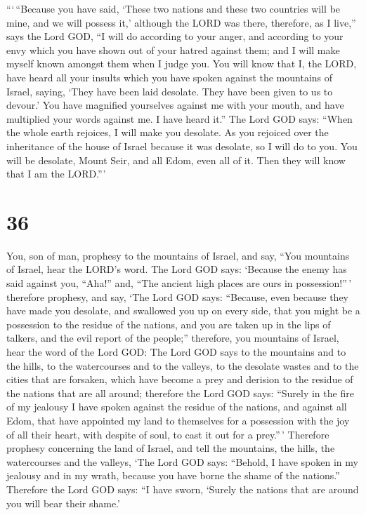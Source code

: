  ```\,``Because you have said, `These two nations and these
two countries will be mine, and we will possess it,' although the LORD
was there,  therefore, as I live,'' says the Lord GOD, ``I
will do according to your anger, and according to your envy which you
have shown out of your hatred against them; and I will make myself known
amongst them when I judge you.  You will know that I, the
LORD, have heard all your insults which you have spoken against the
mountains of Israel, saying, `They have been laid desolate. They have
been given to us to devour.'  You have magnified yourselves
against me with your mouth, and have multiplied your words against me. I
have heard it.''  The Lord GOD says: ``When the whole earth
rejoices, I will make you desolate.  As you rejoiced over
the inheritance of the house of Israel because it was desolate, so I
will do to you. You will be desolate, Mount Seir, and all Edom, even all
of it. Then they will know that I am the LORD.'''

\hypertarget{section-34}{%
\section{36}\label{section-34}}

 You, son of man, prophesy to the mountains of Israel, and
say, ``You mountains of Israel, hear the LORD's word.  The
Lord GOD says: `Because the enemy has said against you, ``Aha!'' and,
``The ancient high places are ours in possession!''\,' 
therefore prophesy, and say, `The Lord GOD says: ``Because, even because
they have made you desolate, and swallowed you up on every side, that
you might be a possession to the residue of the nations, and you are
taken up in the lips of talkers, and the evil report of the people;''
 therefore, you mountains of Israel, hear the word of the
Lord GOD: The Lord GOD says to the mountains and to the hills, to the
watercourses and to the valleys, to the desolate wastes and to the
cities that are forsaken, which have become a prey and derision to the
residue of the nations that are all around;  therefore the
Lord GOD says: ``Surely in the fire of my jealousy I have spoken against
the residue of the nations, and against all Edom, that have appointed my
land to themselves for a possession with the joy of all their heart,
with despite of soul, to cast it out for a prey.''\,' 
Therefore prophesy concerning the land of Israel, and tell the
mountains, the hills, the watercourses and the valleys, `The Lord GOD
says: ``Behold, I have spoken in my jealousy and in my wrath, because
you have borne the shame of the nations.''  Therefore the
Lord GOD says: ``I have sworn, `Surely the nations that are around you
will bear their shame.'


